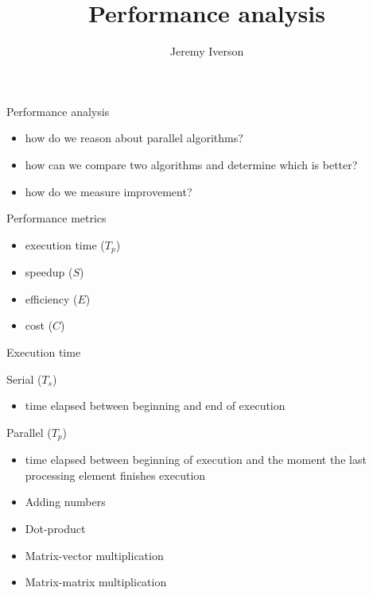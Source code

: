 \documentclass[10pt, t]{beamer}
\title{Performance analysis}
\date{}
\author{Jeremy Iverson}
\institute{College of Saint Benedict \& Saint John's University}
\begin{document}
  \begin{frame}
    \titlepage
  \end{frame}

  \begin{frame}{Performance analysis}
    \begin{itemize}
      \item how do we reason about parallel algorithms?
      \item how can we compare two algorithms and determine which is better?
      \item how do we measure improvement?
    \end{itemize}
  \end{frame}

  \begin{frame}{Performance metrics}
    \begin{itemize}
      \item execution time ($T_p$)
      \item speedup  ($S$)
      \item efficiency ($E$)
      \item cost ($C$)
    \end{itemize}
  \end{frame}

  \begin{frame}{Execution time}
    \begin{block}{Serial ($T_s$)}
      \begin{itemize}
        \item time elapsed between beginning and end of execution
      \end{itemize}
    \end{block}

    \begin{block}{Parallel ($T_p$)}
      \begin{itemize}
        \item time elapsed between beginning of execution and the moment the
          last processing element finishes execution
      \end{itemize}
    \end{block}

    \begin{itemize}
      \item Adding numbers
      \item Dot-product
      \item Matrix-vector multiplication
      \item Matrix-matrix multiplication
    \end{itemize}

  \end{frame}
\end{document}
